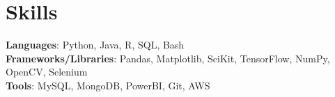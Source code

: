 \section{Skills}
 \begin{itemize}[leftmargin=0.15in, label={}]
    \small{\item{
     \textbf{Languages}{: Python, Java, R, SQL, Bash} \\
     \textbf{Frameworks/Libraries}{: Pandas, Matplotlib, SciKit, TensorFlow, NumPy, OpenCV, Selenium} \\
     \textbf{Tools}{: MySQL, MongoDB, PowerBI, Git, AWS} \\
    }}
 \end{itemize}
